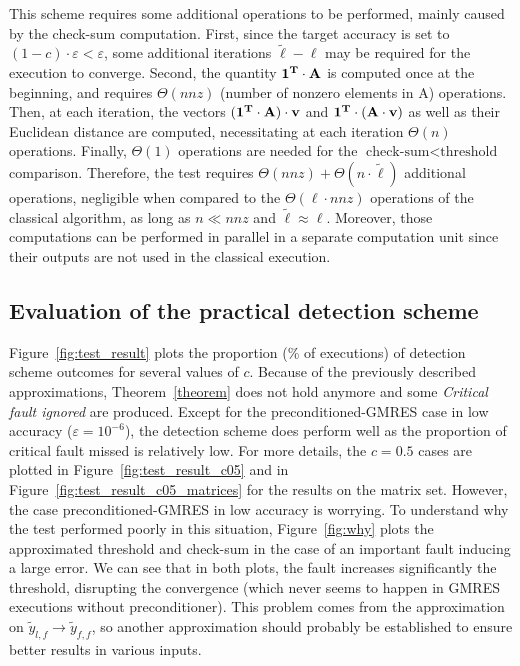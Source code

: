 


This scheme requires some additional operations to be performed, mainly caused by the check-sum computation. First, since the target accuracy is set to $(1-c)\cdot \varepsilon < \varepsilon$, some additional iterations $\widetilde{\ell}-\ell$ may be required for the execution to converge. Second, the quantity $ \bf{1}^T \cdot A$ is computed once at the beginning, and requires $\Theta(nnz)$ (number of nonzero elements in A) operations. Then, at each iteration, the vectors  $(\bf{1}^T \cdot A) \cdot v$ and $\bf{1}^T \cdot (A \cdot v)$ as well as their Euclidean distance are computed, necessitating at each iteration $\Theta(n)$ operations. Finally, $\Theta(1)$ operations are needed for the $\text{check-sum} < \text{threshold}$ comparison. Therefore, the test requires $\Theta(nnz) + \Theta(n \cdot \widetilde{\ell})$ additional operations, negligible when compared to the $\Theta(\ell \cdot nnz)$ operations of the classical algorithm, as long as $n \ll nnz$ and $\widetilde{\ell} \approx \ell$. Moreover, those computations can be performed in parallel in a separate computation unit since their outputs are not used in the classical execution.


\subsection{Evaluation of the practical detection scheme}\label{sec:implementable_evaluated}
Figure~\ref{fig:test_result} plots the proportion (\% of executions) of detection scheme outcomes for several values of $c$. Because of the previously described approximations, Theorem~\ref{theorem} does not hold anymore and some \emph{Critical fault ignored} are produced. Except for the preconditioned-GMRES case in low accuracy ($\varepsilon = 10^{-6}$), the detection scheme does perform well as the proportion of critical fault missed is relatively low. For more details, the $c=0.5$ cases are plotted in Figure~\ref{fig:test_result_c05} and in Figure~\ref{fig:test_result_c05_matrices} for the results on the matrix set. However, the case preconditioned-GMRES in low accuracy is worrying. To understand why the test performed poorly in this situation, Figure~\ref{fig:why} plots the approximated threshold and check-sum in the case of an important fault inducing a large error. We can see that in both plots, the fault increases significantly the threshold, disrupting the convergence (which never seems to happen in GMRES executions without preconditioner). This problem comes from the approximation on $\widetilde{y}_{l, f} \rightarrow \widetilde{y}_{f, f}$, so another approximation should probably be established to ensure better results in various inputs.



